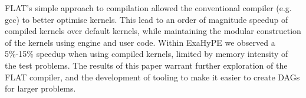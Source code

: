FLAT's simple approach to compilation allowed the conventional compiler (e.g. gcc) to better optimise kernels.
This lead to an order of magnitude speedup of compiled kernels over default kernels, while maintaining the modular construction of the kernels using engine and user code.
Within ExaHyPE we observed a 5\%-15\% speedup when using compiled kernels, limited by memory intensity of the test problems.
The results of this paper warrant further exploration of the FLAT compiler, and the development of tooling to make it easier to create DAGs for larger problems. 